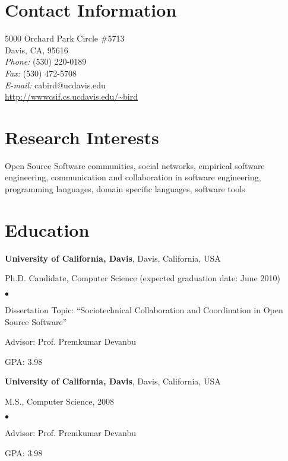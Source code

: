 \documentclass[margin,line,article]{res}
\newenvironment{list1}{
  \begin{list}{}{%
      \setlength{\itemsep}{0in}
      \setlength{\parsep}{0in} \setlength{\parskip}{0in}
      \setlength{\topsep}{0in} \setlength{\partopsep}{0in} 
      \setlength{\leftmargin}{0.17in}}}{\end{list}}
\newenvironment{list2}{
  \begin{list}{$\bullet$}{%
      \setlength{\itemsep}{0in}
      \setlength{\parsep}{0in} \setlength{\parskip}{0in}
      \setlength{\topsep}{0in} \setlength{\partopsep}{0in} 
      \setlength{\leftmargin}{0.2in}}}{\end{list}}
\begin{document}



\begin{resume}
\section{Contact Information}
\vspace{.05in}
5000 Orchard Park Circle \#5713\\
Davis, CA, 95616\\
{\it Phone:}  (530) 220-0189 \\
{\it Fax:}    (530) 472-5708 \\
{\it E-mail:}  cabird@ucdavis.edu\\
\url{http://wwwcsif.cs.ucdavis.edu/~bird}
 
\section{Research Interests}
Open Source Software communities, social networks, empirical software engineering, 
communication and collaboration in software engineering, programming languages, 
domain specific languages, software tools

\section{Education}
\textbf{University of California, Davis}, Davis, California, USA
\begin{list1}
\item Ph.D. Candidate, Computer Science (expected
  graduation date: June 2010)
\begin{list2}
\vspace*{.05in}
\item Dissertation Topic:  ``Sociotechnical Collaboration and Coordination in Open Source Software'' 
\item Advisor:  Prof. Premkumar Devanbu
\item GPA: 3.98
\end{list2}
\end{list1}

\textbf{University of California, Davis}, Davis, California, USA
\begin{list1}
\item M.S., Computer Science, 2008
\begin{list2}
\vspace*{.05in}
\item Advisor:  Prof. Premkumar Devanbu
\item GPA: 3.98
\end{list2}
\end{list1}


\end{resume}
\end{document}
